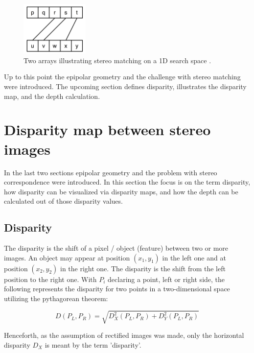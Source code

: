 \begin{figure}[h!]
  \centering
  \includegraphics[width=0.3\textwidth]{src/images/stereo-matching.png}
  \caption[Two arrays illustrating stereo matching on a 1D search space]{Two arrays illustrating stereo matching on a 1D search space \citep{kack2004robust}.}
  \label{fig:stereo-matching}
\end{figure}

\noindent Up to this point the epipolar geometry and the challenge with stereo matching were introduced.
The upcoming section defines disparity, illustrates the disparity map, and the depth calculation.

\section{Disparity map between stereo images}

In the last two sections epipolar geometry and the problem with stereo correspondence were introduced.
In this section the focus is on the term disparity, how disparity can be visualized via disparity maps, and how the depth can be calculated out of those disparity values.

\subsection*{Disparity}

The disparity is the shift of a pixel / object (feature) between two or more images.
An object may appear at position $(x_1,y_1)$ in the left one and at position $(x_2,y_2)$ in the right one.
The disparity is the shift from the left position to the right one.
With $P_i$ declaring a point, left or right side, the following represents the disparity for two points in a two-dimensional space utilizing the pythagorean theorem:

\begin{equation}
  D(P_L,P_R) = \sqrt{D^2_X(P_L,P_R) + D^2_Y(P_L,P_R)}
\end{equation}

\noindent Henceforth, as the assumption of rectified images was made, only the horizontal disparity $D_X$ is meant by the term 'disparity'.

